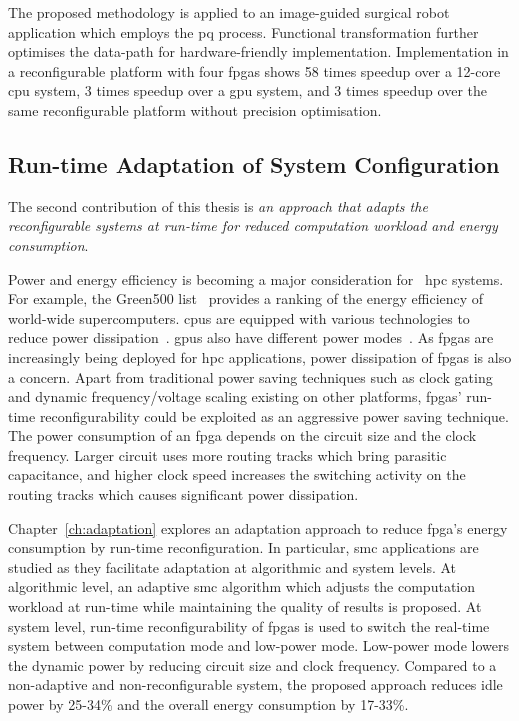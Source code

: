 The proposed methodology is applied to an image-guided surgical robot application which employs the \gls{pq} process.
Functional transformation further optimises the data-path for hardware-friendly implementation.
Implementation in a reconfigurable platform with four \glspl{fpga} shows 58 times speedup over a 12-core \gls{cpu} system, 3 times speedup over a \gls{gpu} system, and 3 times speedup over the same reconfigurable platform without precision optimisation.

\subsection{Run-time Adaptation of System Configuration}

The second contribution of this thesis is \textit{an approach that adapts the reconfigurable systems at run-time for reduced computation workload and energy consumption}.

Power and energy efficiency is becoming a major consideration for ~\gls{hpc} systems.
For example, the Green500 list~\cite{green500} provides a ranking of the energy efficiency of world-wide supercomputers.
\glspl{cpu} are equipped with various technologies to reduce power dissipation~\cite{intelsleep,intelturboboost}.
\glspl{gpu} also have different power modes~\cite{amdpower,nvidiapower}.
As \glspl{fpga} are increasingly being deployed for \gls{hpc} applications, power dissipation of \glspl{fpga} is also a concern.
Apart from traditional power saving techniques such as clock gating and dynamic frequency/voltage scaling existing on other platforms, \glspl{fpga}' run-time reconfigurability could be exploited as an aggressive power saving technique.
The power consumption of an \gls{fpga} depends on the circuit size and the clock frequency.
Larger circuit uses more routing tracks which bring parasitic capacitance,
and higher clock speed increases the switching activity on the routing tracks which causes significant power dissipation.

Chapter~\ref{ch:adaptation} explores an adaptation approach to reduce \gls{fpga}'s energy consumption by run-time reconfiguration.
In particular, \gls{smc} applications are studied as they facilitate adaptation at algorithmic and system levels.
At algorithmic level, an adaptive \gls{smc} algorithm which adjusts the computation workload at run-time while maintaining the quality of results is proposed.
At system level, run-time reconfigurability of \glspl{fpga} is used to switch the real-time system between computation mode and low-power mode.
Low-power mode lowers the dynamic power by reducing circuit size and clock frequency.
Compared to a non-adaptive and non-reconfigurable system, the proposed approach reduces idle power by 25-34\% and the overall energy consumption by 17-33\%.


